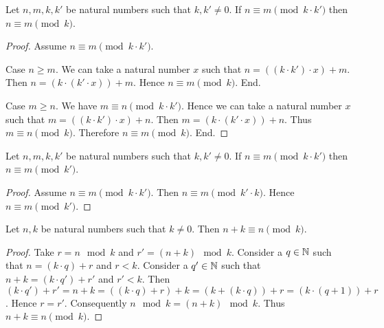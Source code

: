 \documentclass[10pt]{article}
\begin{document}
  \begin{forthel}
    \begin{proposition}[id=ARITHMETIC_08_2988318228742144,printid]
      Let $n, m, k, k'$ be natural numbers such that $k, k' \neq 0$.
      If $n \equiv m \pmod{k \cdot k'}$ then $n \equiv m \pmod{k}$.
    \end{proposition}
    \begin{proof}
      Assume $n \equiv m \pmod{k \cdot k'}$.

      Case $n \geq m$.
        We can take a natural number $x$ such that $n = ((k \cdot k') \cdot x) + m$.
        Then $n = (k \cdot (k' \cdot x)) + m$.
        Hence $n \equiv m \pmod{k}$.
      End.

      Case $m \geq n$.
        We have $m \equiv n \pmod{k \cdot k'}$.
        Hence we can take a natural number $x$ such that $m = ((k \cdot k') \cdot x) + n$.
        Then $m = (k \cdot (k' \cdot x)) + n$.
        Thus $m \equiv n \pmod{k}$.
        Therefore $n \equiv m \pmod{k}$.
      End.
    \end{proof}
  \end{forthel}

  \begin{forthel}
    \begin{corollary}[id=ARITHMETIC_08_5895145169879040,printid]
      Let $n, m, k, k'$ be natural numbers such that $k, k' \neq 0$.
      If $n \equiv m \pmod{k \cdot k'}$ then $n \equiv m \pmod{k'}$.
    \end{corollary}
    \begin{proof}
      Assume $n \equiv m \pmod{k \cdot k'}$.
      Then $n \equiv m \pmod{k' \cdot k}$.
      Hence $n \equiv m \pmod{k'}$.
    \end{proof}
  \end{forthel}

  \begin{forthel}
    \begin{proposition}[id=ARITHMETIC_08_5984712287846400,printid]
      Let $n, k$ be natural numbers such that $k \neq 0$.
      Then $n + k \equiv n \pmod{k}$.
    \end{proposition}
    \begin{proof}
      Take $r = n \mod k$ and $r' = (n + k) \mod k$.
      Consider a $q \in \mathbb{N}$ such that $n = (k \cdot q) + r$ and $r < k$.
      Consider a $q' \in \mathbb{N}$ such that $n + k = (k \cdot q') + r'$ and
      $r' < k$.
      Then $(k \cdot q') + r'
        = n + k
        = ((k \cdot q) + r) + k
        = (k + (k \cdot q)) + r
        = (k \cdot (q + 1)) + r$.
      Hence $r = r'$.
      Consequently $n \mod k = (n + k) \mod k$.
      Thus $n + k \equiv n \pmod{k}$.
    \end{proof}
  \end{forthel}
\end{document}
